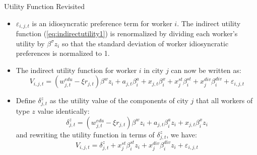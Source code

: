 \documentclass[aspectratio=169]{beamer}
\begin{document}

\begin{frame}{Utility Function Revisited}

\begin{itemize}
    \item<1-> $ \varepsilon_{i,j,t} $ is an idiosyncratic preference term for worker $ i $.  The indirect utility function (\ref{eq:indirectutility1}) is renormalized by dividing each worker’s utility by $ \beta^{\sigma} z_{i} $ so that the standard deviation of worker idiosyncratic preferences is normalized to 1.
    \item<2-> The indirect utility function for worker $ i $ in city $ j $ can now be written as:
    \begin{equation*}
        V_{i,j,t} = \left( w_{j,t}^{edu} - \xi r_{j,t} \right) \beta^{w} z_{i} + a_{j,t} \beta_{i}^{a} + x_{j,t} \beta_{i}^{x} + x_{j}^{st}\beta_{i}^{st} + x_{j}^{div} \beta_{i}^{div} + \varepsilon_{i,j,t}
    \end{equation*}
    \item<3-> Define $ \delta_{j,t}^{z} $ as the utility value of the components of city $ j $ that all workers of type $ z $ value identically:
    \begin{equation*}
        \delta_{j,t}^{z} = \left( w_{j,t}^{edu} - \xi r_{j,t} \right) \beta^{w} z_{i} + a_{j,t} \beta_{i}^{a} z_{i} + x_{j,t} \beta_{i}^{x} z_{i}
    \end{equation*}
    and rewriting the utility function in terms of $ \delta_{j,t}^{z} $, we have:
    \begin{equation*}
        V_{i,j,t} = \delta_{j,t}^{z} + x_{j}^{st}\beta_{i}^{st} z_{i} + x_{j}^{div} \beta_{i}^{div} z_{i} + \varepsilon_{i,j,t}
    \end{equation*}
\end{itemize}
    
\end{frame}

\end{document}
